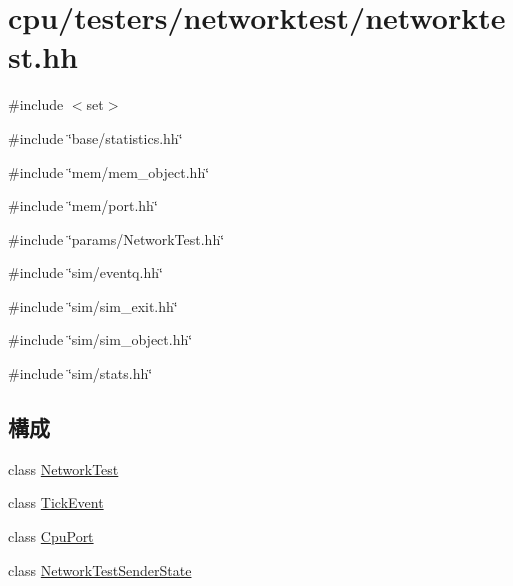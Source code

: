 \hypertarget{networktest_8hh}{
\section{cpu/testers/networktest/networktest.hh}
\label{networktest_8hh}
}
{\ttfamily \#include $<$set$>$}\par
{\ttfamily \#include \char`\"{}base/statistics.hh\char`\"{}}\par
{\ttfamily \#include \char`\"{}mem/mem\_\-object.hh\char`\"{}}\par
{\ttfamily \#include \char`\"{}mem/port.hh\char`\"{}}\par
{\ttfamily \#include \char`\"{}params/NetworkTest.hh\char`\"{}}\par
{\ttfamily \#include \char`\"{}sim/eventq.hh\char`\"{}}\par
{\ttfamily \#include \char`\"{}sim/sim\_\-exit.hh\char`\"{}}\par
{\ttfamily \#include \char`\"{}sim/sim\_\-object.hh\char`\"{}}\par
{\ttfamily \#include \char`\"{}sim/stats.hh\char`\"{}}\par
\subsection*{構成}
\begin{DoxyCompactItemize}
\item 
class \hyperlink{classNetworkTest}{NetworkTest}
\item 
class \hyperlink{classNetworkTest_1_1TickEvent}{TickEvent}
\item 
class \hyperlink{classNetworkTest_1_1CpuPort}{CpuPort}
\item 
class \hyperlink{classNetworkTest_1_1NetworkTestSenderState}{NetworkTestSenderState}
\end{DoxyCompactItemize}
